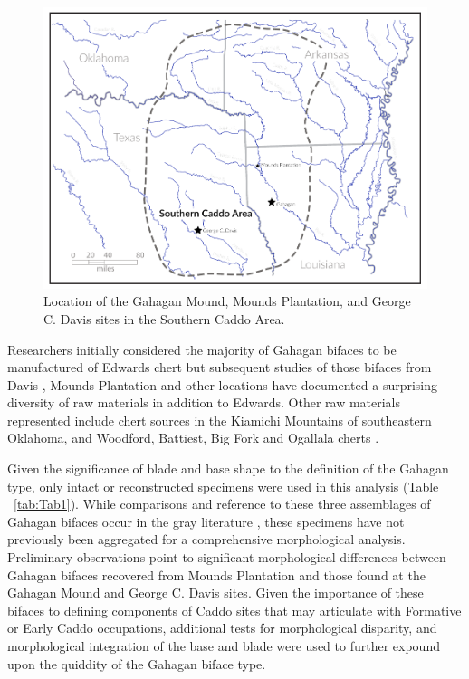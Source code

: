 \documentclass[review]{elsarticle}
\begin{document}
\begin{figure}[ht]\centering
\includegraphics[width=\linewidth]{SCA}
\caption{Location of the Gahagan Mound, Mounds Plantation, and George C. Davis sites in the Southern Caddo Area.}
\label{fig:SCA}
\end{figure}

Researchers initially considered the majority of Gahagan bifaces to be manufactured of Edwards chert but subsequent studies of those bifaces from Davis \citep{RN4924}, Mounds Plantation \citep{RN11561} and other locations \citep{RN1001} have documented a surprising diversity of raw materials in addition to Edwards. Other raw materials represented include chert sources in the Kiamichi Mountains of southeastern Oklahoma, and Woodford, Battiest, Big Fork and Ogallala cherts \citep{RN1001}.

Given the significance of blade and base shape to the definition of the Gahagan type, only intact or reconstructed specimens were used in this analysis (Table ~\ref{tab:Tab1}). While comparisons and reference to these three assemblages of Gahagan bifaces occur in the gray literature \citep{RN11571,RN11565,RN11570,RN11568}, these specimens have not previously been aggregated for a comprehensive morphological analysis. Preliminary observations point to significant morphological differences between Gahagan bifaces recovered from Mounds Plantation and those found at the Gahagan Mound and George C. Davis sites. Given the importance of these bifaces to defining components of Caddo sites that may articulate with Formative or Early Caddo occupations, additional tests for morphological disparity, and morphological integration of the base and blade were used to further expound upon the quiddity of the Gahagan biface type.
\end{document}
